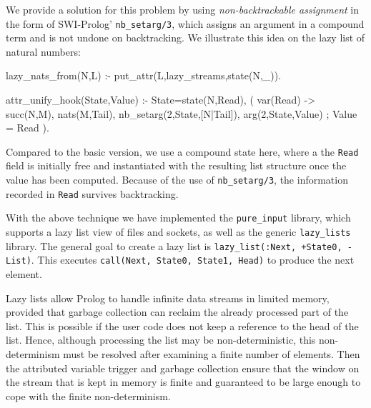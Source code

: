 \documentclass{new_tlp}
\begin{document}
We provide a solution for this problem by using \emph{non-backtrackable
assignment} in the form of SWI-Prolog' \texttt{nb\_setarg/3}, which assigns an
argument in a compound term and is not undone on backtracking. We illustrate this
idea on the lazy list of natural numbers:
\begin{code}
lazy_nats_from(N,L) :- put_attr(L,lazy_streams,state(N,_)).

attr_unify_hook(State,Value) :-
  State=state(N,Read),
  ( var(Read) ->
      succ(N,M),
      nats(M,Tail),
      nb_setarg(2,State,[N|Tail]),
      arg(2,State,Value)
  ;
      Value = Read
  ).
\end{code}
Compared to the basic version, we use a compound state here, where a
the \texttt{Read} field is initially free 
and instantiated with the resulting list structure once the value has been computed. Because
of the use of {\tt nb\_setarg/3}, the information recorded in \texttt{Read}
survives backtracking.

With the above technique we have implemented the \texttt{pure\_input} library, which supports a lazy list view of files and sockets, 
as well as the generic
\texttt{lazy\_lists}
library. The general goal to create a lazy list is
\texttt{lazy\_list(:Next, +State0, -List)}. This executes
\texttt{call(Next, State0, State1, Head)} to produce the next element.

Lazy lists allow Prolog to handle infinite data streams in limited memory, provided that garbage
collection can reclaim the already processed part of the list. This is possible
if the user code does not keep a reference to the head of the list.
Hence, although processing the list may be non-deterministic,
this non-determinism must be resolved after examining a finite number of
elements. Then the attributed variable trigger and garbage collection ensure
that the window on the stream that is kept in memory is finite and
guaranteed to be large enough to cope with the finite non-determinism.


% 


\end{document}
